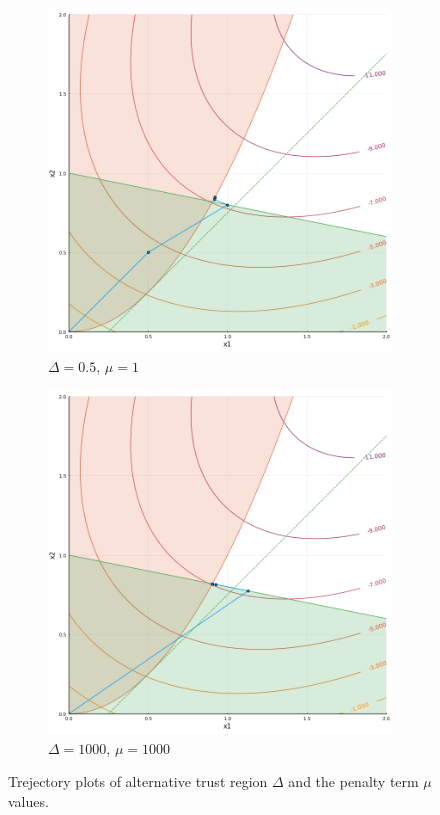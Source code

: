 \documentclass{article}
\begin{document}
	\begin{figure}
		\centering
		\begin{subfigure}[b]{0.45\textwidth}
			\centering
			\includegraphics[width=\textwidth]{SQP_example_small}
			\caption{$\Delta=0.5$, $\mu=1$}
		\end{subfigure}
		\hfill
		\begin{subfigure}[b]{0.45\textwidth}
			\centering
			\includegraphics[width=\textwidth]{SQP_example_large}
			\caption{$\Delta=1000$, $\mu=1000$}
		\end{subfigure}
		\caption{Trejectory plots of alternative trust region $\Delta$ and the penalty term $\mu$ values.}
		\label{fig:3_extra}
	\end{figure}
\end{document}
